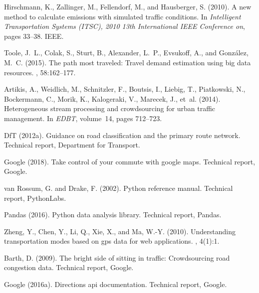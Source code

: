 \documentclass{CUP-JNL-DCE}
\begin{document}
\begin{Backmatter}
\begin{thebibliography}{}
Hirschmann, K., Zallinger, M., Fellendorf, M., and Hausberger, S. (2010).
\newblock A new method to calculate emissions with simulated traffic
conditions.
\newblock In {\em Intelligent Transportation Systems (ITSC), 2010 13th
	International IEEE Conference on}, pages 33--38. IEEE.

Toole, J.~L., Colak, S., Sturt, B., Alexander, L.~P., Evsukoff, A., and
Gonz{\'a}lez, M.~C. (2015).
\newblock The path most traveled: Travel demand estimation using big data
resources.
,
58:162--177.

Artikis, A., Weidlich, M., Schnitzler, F., Boutsis, I., Liebig, T., Piatkowski,
N., Bockermann, C., Morik, K., Kalogeraki, V., Marecek, J., et~al. (2014).
\newblock Heterogeneous stream processing and crowdsourcing for urban traffic
management.
\newblock In {\em EDBT}, volume~14, pages 712--723.

DfT (2012a).
\newblock Guidance on road classification and the primary route network.
\newblock Technical report, Department for Transport.

Google (2018).
\newblock Take control of your commute with google maps.
\newblock Technical report, Google.

van Rossum, G. and Drake, F. (2002).
\newblock Python reference manual.
\newblock Technical report, PythonLabs.

Pandas (2016).
\newblock Python data analysis library.
\newblock Technical report, Pandas.


Zheng, Y., Chen, Y., Li, Q., Xie, X., and Ma, W.-Y. (2010).
\newblock Understanding transportation modes based on gps data for web
applications.
, 4(1):1.

Barth, D. (2009).
\newblock The bright side of sitting in traffic: Crowdsourcing road congestion
data.
\newblock Technical report, Google.

Google (2016a).
\newblock Directions api documentation.
\newblock Technical report, Google.


\end{thebibliography}
\end{Backmatter}
\end{document}
